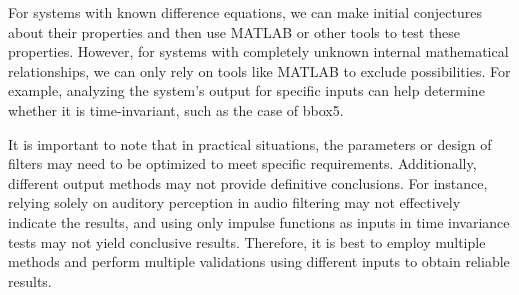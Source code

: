 \documentclass[journal]{IEEEtran}
\begin{document}
For systems with known difference equations, we can make initial conjectures about their properties and then use MATLAB or other tools to test these properties. However, for systems with completely unknown internal mathematical relationships, we can only rely on tools like MATLAB to exclude possibilities. For example, analyzing the system's output for specific inputs can help determine whether it is time-invariant, such as the case of bbox5. 

It is important to note that in practical situations, the parameters or design of filters may need to be optimized to meet specific requirements. 
Additionally, different output methods may not provide definitive conclusions. 
For instance, relying solely on auditory perception in audio filtering may not effectively indicate the results, and using only impulse functions as inputs in time invariance tests may not yield conclusive results. Therefore, it is best to employ multiple methods and perform multiple validations using different inputs to obtain reliable results.
\end{document}
